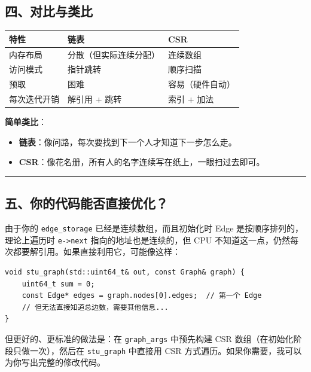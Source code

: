 \documentclass[11pt, a4paper]{article}
\begin{document}
\begin{aibox}
\subsection*{四、对比与类比}

\begin{tcolorbox}[colback=white,colframe=gray!50!white,boxrule=0.5pt,arc=2pt,left=5pt,right=5pt,top=5pt,bottom=5pt]
\vspace{0.5em}
\begin{tabularx}{\textwidth}{@{} l X X @{}}
\toprule
特性 & 链表 & CSR \\
\midrule
内存布局 & 分散（但实际连续分配） & 连续数组 \\
访问模式 & 指针跳转 & 顺序扫描 \\
预取 & 困难 & 容易（硬件自动） \\
每次迭代开销 & 解引用 + 跳转 & 索引 + 加法 \\
\bottomrule
\end{tabularx}
\vspace{0.5em}
\end{tcolorbox}

\textbf{简单类比}：
\begin{itemize}
    \item \textbf{链表}：像问路，每次要找到下一个人才知道下一步怎么走。
    \item \textbf{CSR}：像花名册，所有人的名字连续写在纸上，一眼扫过去即可。
\end{itemize}

\begin{center}\rule{\textwidth}{0.4pt}\end{center}

\subsection*{五、你的代码能否直接优化？}

由于你的 \texttt{edge\_storage} 已经是连续数组，而且初始化时 Edge 是按顺序排列的，理论上遍历时 \texttt{e->next} 指向的地址也是连续的，但 CPU 不知道这一点，仍然每次都要解引用。如果直接利用它，可能像这样：

\begin{tcolorbox}[colback=white,colframe=gray!50!white,boxrule=0.5pt,arc=2pt,left=5pt,right=5pt,top=5pt,bottom=5pt]
\begin{verbatim}
void stu_graph(std::uint64_t& out, const Graph& graph) {
    uint64_t sum = 0;
    const Edge* edges = graph.nodes[0].edges;  // 第一个 Edge
    // 但无法直接知道总边数，需要其他信息...
}
\end{verbatim}
\end{tcolorbox}

但更好的、更标准的做法是：在 \texttt{graph\_args} 中预先构建 CSR 数组（在初始化阶段只做一次），然后在 \texttt{stu\_graph} 中直接用 CSR 方式遍历。如果你需要，我可以为你写出完整的修改代码。
\end{aibox}
\end{document}
